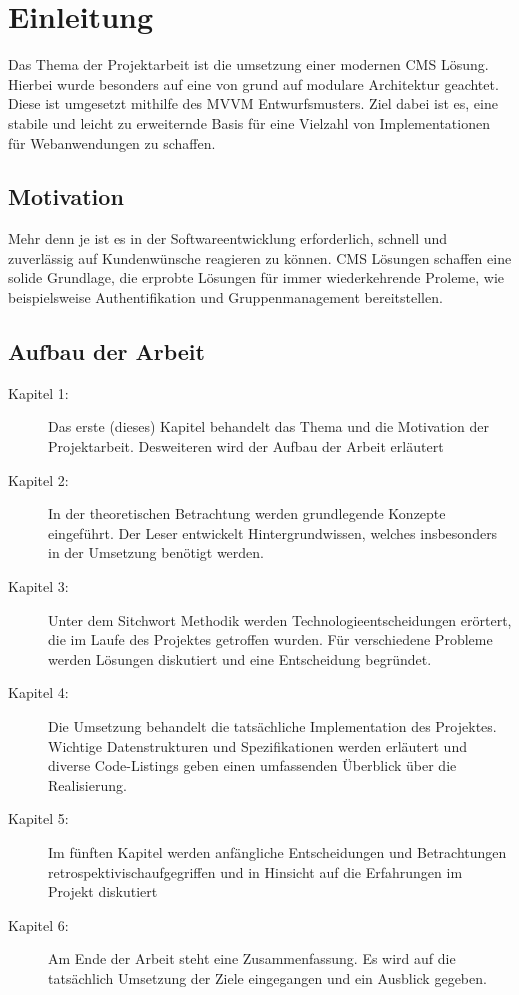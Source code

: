 \chapter{Einleitung}
Das Thema der Projektarbeit ist die umsetzung einer modernen \ac{CMS} Lösung. Hierbei wurde besonders auf eine von grund auf modulare Architektur geachtet. Diese ist umgesetzt mithilfe des \ac{MVVM} Entwurfsmusters. Ziel dabei ist es, eine stabile und leicht zu erweiternde Basis für eine Vielzahl von Implementationen für Webanwendungen zu schaffen.

\section{Motivation}
Mehr denn je ist es in der Softwareentwicklung erforderlich, schnell und zuverlässig auf Kundenwünsche reagieren zu können. \acs{CMS} Lösungen schaffen eine solide Grundlage, die erprobte Lösungen für immer wiederkehrende Proleme, wie beispielsweise Authentifikation und Gruppenmanagement bereitstellen.

\section{Aufbau der Arbeit}
\begin{description}
\item[Kapitel 1:]{Das erste (dieses) Kapitel behandelt das Thema und die Motivation der Projektarbeit. Desweiteren wird der Aufbau der Arbeit erläutert}
\item[Kapitel 2:]{In der theoretischen Betrachtung werden grundlegende Konzepte eingeführt. Der Leser entwickelt Hintergrundwissen, welches insbesonders in der Umsetzung benötigt werden.}
\item[Kapitel 3:]{Unter dem Sitchwort Methodik werden Technologieentscheidungen erörtert, die im Laufe des Projektes getroffen wurden. Für verschiedene Probleme werden Lösungen diskutiert und eine Entscheidung begründet.}
\item[Kapitel 4:]{Die Umsetzung behandelt die tatsächliche Implementation des Projektes. Wichtige Datenstrukturen und Spezifikationen werden erläutert und diverse Code-Listings geben einen umfassenden Überblick über die Realisierung.}
\item[Kapitel 5:]{Im fünften Kapitel werden anfängliche Entscheidungen und Betrachtungen retrospektivischaufgegriffen und in Hinsicht auf die Erfahrungen im Projekt diskutiert}
\item[Kapitel 6:]{Am Ende der Arbeit steht eine Zusammenfassung. Es wird auf die tatsächlich Umsetzung der Ziele eingegangen und ein Ausblick gegeben.}
\end{description}
